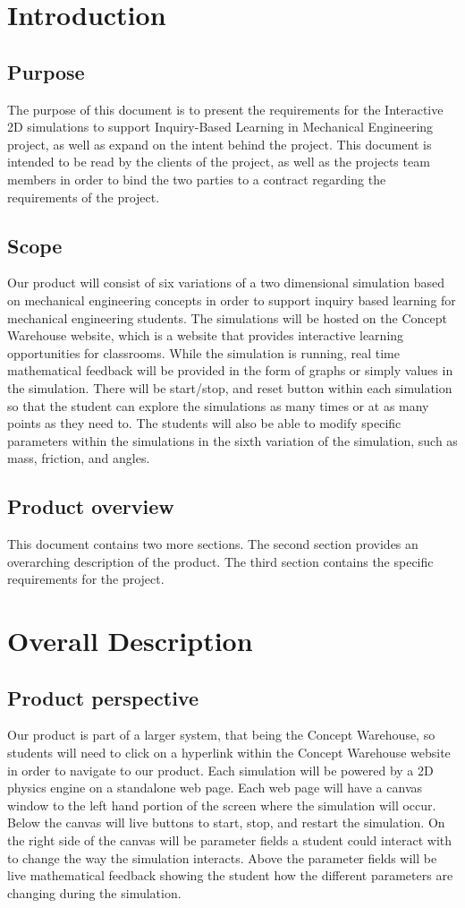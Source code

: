 \documentclass[onecolumn, draftclsnofoot,10pt, compsoc]{IEEEtran}
\begin{document}
\section{Introduction}
\subsection{Purpose}
The purpose of this document is to present the requirements for the Interactive 2D simulations to support Inquiry-Based Learning in Mechanical Engineering project, as well as expand on the intent behind the project. This document is intended to be read by the clients of the project, as well as the projects team members in order to bind the two parties to a contract regarding the requirements of the project.
\subsection{Scope}
Our product will consist of six variations of a two dimensional simulation based on mechanical engineering concepts in order to support inquiry based learning for mechanical engineering students. The simulations will be hosted on the Concept Warehouse website, which is a website that provides interactive learning opportunities for classrooms. While the simulation is running, real time mathematical feedback will be provided in the form of graphs or simply values in the simulation. There will be start/stop, and reset button within each simulation so that the student can explore the simulations as many times or at as many points as they need to. The students will also be able to modify specific parameters within the simulations in the sixth variation of the simulation, such as mass, friction, and angles.
\subsection{Product overview}
This document contains two more sections. The second section provides an overarching description of the product. The third section contains the specific requirements for the project.
\section{Overall Description}
\subsection{Product perspective}
Our product is part of a larger system, that being the Concept Warehouse, so students will need to click on a hyperlink within the Concept Warehouse website in order to navigate to our product. Each simulation will be powered by a 2D physics engine on a standalone web page. Each web page will have a canvas window to the left hand portion of the screen where the simulation will occur. Below the canvas will live buttons to start, stop, and restart the simulation. On the right side of the canvas will be parameter fields a student could interact with to change the way the simulation interacts. Above the parameter fields will be live mathematical feedback showing the student how the different parameters are changing during the simulation.
\end{document}
